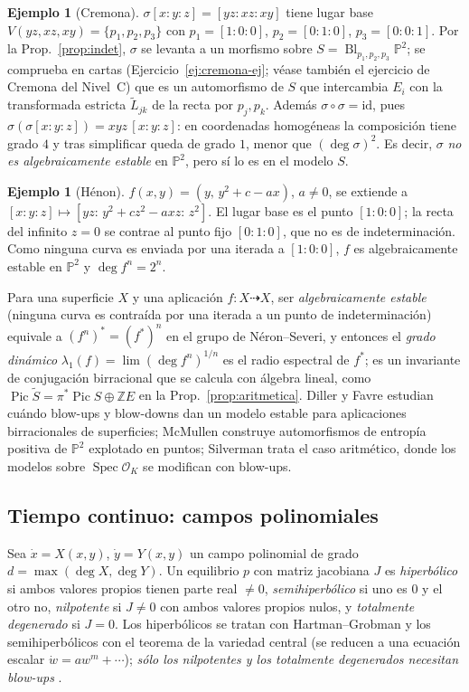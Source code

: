 \documentclass[11pt,a4paper]{article}
\newcommand{\Spec}{\operatorname{Spec}}
\newcommand{\Bl}{\operatorname{Bl}}
\newcommand{\Pic}{\operatorname{Pic}}
\newcommand{\PP}{\mathbb{P}}
\newcommand{\ZZ}{\mathbb{Z}}
\theoremstyle{plain}
\theoremstyle{definition}
\newtheorem{ejemplo}[teorema]{Ejemplo}
\theoremstyle{remark}
\newcounter{ejer}
\begin{document}
\begin{ejemplo}[Cremona]\label{ej:cremona}
$\sigma[x:y:z]=[yz:xz:xy]$ tiene lugar base $V(yz,xz,xy)=\{p_1,p_2,p_3\}$ con $p_1=[1:0:0]$, $p_2=[0:1:0]$, $p_3=[0:0:1]$. Por la Prop.~\ref{prop:indet}, $\sigma$ se levanta a un morfismo sobre $S=\Bl_{p_1,p_2,p_3}\PP^2$; se comprueba en cartas (Ejercicio~\ref{ej:cremona-ej}; véase también el ejercicio de Cremona del Nivel~C) que es un automorfismo de $S$ que intercambia $E_i$ con la transformada estricta $\tilde L_{jk}$ de la recta por $p_j,p_k$. Además $\sigma\circ\sigma=\mathrm{id}$, pues $\sigma(\sigma[x:y:z])=xyz\,[x:y:z]$: en coordenadas homogéneas la composición tiene grado $4$ y tras simplificar queda de grado $1$, menor que $(\deg\sigma)^2$. Es decir, $\sigma$ \emph{no es algebraicamente estable} en $\PP^2$, pero sí lo es en el modelo $S$.
\end{ejemplo}

\begin{ejemplo}[Hénon]\label{ej:henon}
$f(x,y)=(y,\,y^2+c-ax)$, $a\neq0$, se extiende a $[x:y:z]\mapsto[yz:\,y^2+cz^2-axz:\,z^2]$. El lugar base es el punto $[1:0:0]$; la recta del infinito $z=0$ se contrae al punto fijo $[0:1:0]$, que no es de indeterminación. Como ninguna curva es enviada por una iterada a $[1:0:0]$, $f$ es algebraicamente estable en $\PP^2$ y $\deg f^n=2^n$.
\end{ejemplo}

Para una superficie $X$ y una aplicación $f\colon X\dashrightarrow X$, ser \emph{algebraicamente estable} (ninguna curva es contraída por una iterada a un punto de indeterminación) equivale a $(f^n)^*=(f^*)^n$ en el grupo de Néron--Severi, y entonces el \emph{grado dinámico} $\lambda_1(f)=\lim(\deg f^n)^{1/n}$ es el radio espectral de $f^*$; es un invariante de conjugación birracional que se calcula con álgebra lineal, como $\Pic\tilde S=\pi^*\Pic S\oplus\ZZ E$ en la Prop.~\ref{prop:aritmetica}. Diller y Favre \cite{DF} estudian cuándo blow-ups y blow-downs dan un modelo estable para aplicaciones birracionales de superficies; McMullen \cite{McM} construye automorfismos de entropía positiva de $\PP^2$ explotado en puntos; Silverman \cite{Sil} trata el caso aritmético, donde los modelos sobre $\Spec\mathcal O_K$ se modifican con blow-ups.

\subsection{Tiempo continuo: campos polinomiales}

Sea $\dot x=X(x,y)$, $\dot y=Y(x,y)$ un campo polinomial de grado $d=\max(\deg X,\deg Y)$. Un equilibrio $p$ con matriz jacobiana $J$ es \emph{hiperbólico} si ambos valores propios tienen parte real $\ne0$, \emph{semihiperbólico} si uno es $0$ y el otro no, \emph{nilpotente} si $J\neq0$ con ambos valores propios nulos, y \emph{totalmente degenerado} si $J=0$. Los hiperbólicos se tratan con Hartman--Grobman y los semihiperbólicos con el teorema de la variedad central (se reducen a una ecuación escalar $\dot w=aw^m+\cdots$); \emph{sólo los nilpotentes y los totalmente degenerados necesitan blow-ups} \cite{DLA}.
\end{document}
